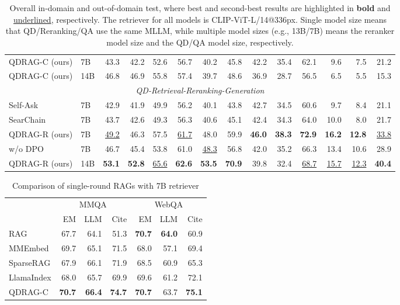 \documentclass[letterpaper]{article} %
\begin{document}
\begin{table}[t]
\begin{tabular}{@{}llrrrrrrrrrrrr@{}}
QDRAG-C (ours) & 7B & 43.3 & 42.2 & 52.6 & 56.7 & 40.2 & 45.8 & 42.2 & 35.4 & 62.1 & 9.6 & 7.5 & 21.2 \\
QDRAG-C (ours)& 14B & 46.8 & 46.9 & 55.8 & 57.4 & 39.7 & 48.6 & 36.9 & 28.7 & 56.5 & 6.5 & 5.5 & 15.3 \\
\midrule
\multicolumn{14}{c}{\textit{QD-Retrieval-Reranking-Generation}} \\
\midrule
Self-Ask & 7B & 42.9 & 41.9 & 49.9 & 56.2 & 40.1 & 43.8 & 42.7 & 34.5 & 60.6 & 9.7 & 8.4 & 21.1 \\
SearChain & 7B & 43.7 & 42.6 & 49.3 & 56.3 & 40.6 & 45.1 & 42.4 & 34.3 & 64.0 & 10.0 & 8.0 & 21.7 \\
\hdashline
QDRAG-R (ours)& 7B & \underline{49.2} & 46.3 & 57.5 & \underline{61.7} & 48.0 & 59.9 & \textbf{46.0} & \textbf{38.3} & \textbf{72.9} & \textbf{16.2} & \textbf{12.8} & \underline{33.8} \\
w/o DPO & 7B & 46.7 & 45.4 & 53.8 & 61.0 & \underline{48.3} & 56.8 & 42.0 & 35.2 & 66.3 & 13.4 & 10.6 & 28.9 \\
QDRAG-R (ours)& 14B & \textbf{53.1} & \textbf{52.8} & \underline{65.6} & \textbf{62.6} & \textbf{53.5} & \textbf{70.9} & 39.8 & 32.4 & \underline{68.7} & \underline{15.7} & \underline{12.3} & \textbf{40.4} \\ 
\bottomrule
\end{tabular}
\caption{Overall in-domain and out-of-domain test, where best and second-best results are highlighted in \textbf{bold} and \underline{underlined}, respectively. The retriever for all models is CLIP-ViT-L/14@336px.  Single model size means that QD/Reranking/QA use the same MLLM, while multiple model sizes (e.g., 13B/7B) means the reranker model size and the QD/QA model size, respectively. }
    \label{tab:main}
    \vspace*{-1mm}
\end{table}


\begin{table}[t]
    \centering
\begin{tabular}{@{}lrrrrrr@{}}
\toprule
& \multicolumn{3}{c}{MMQA} & \multicolumn{3}{c}{WebQA} \\
& EM & LLM & Cite & EM & LLM & Cite \\ \midrule
RAG & 67.7 & 64.1& 51.3 & \textbf{70.7} &\textbf{64.0}& 60.9 \\
MMEmbed & 69.7& 65.1& 71.5 & 68.0 &57.1& 69.4\\
SparseRAG & 67.9& 66.1& 71.9 & 68.5 & 60.9&65.3 \\
LlamaIndex & 68.0&65.7 & 69.9 & 69.6 &61.2& 72.1\\
QDRAG-C & \textbf{70.7} &\textbf{66.4}& \textbf{74.7} & \textbf{70.7} &63.7& \textbf{75.1} \\
\bottomrule
\end{tabular}
\caption{Comparison of single-round RAGs with 7B retriever}
    \label{tab:7bret}
    \vspace*{-3mm}
\end{table}
\end{document}
